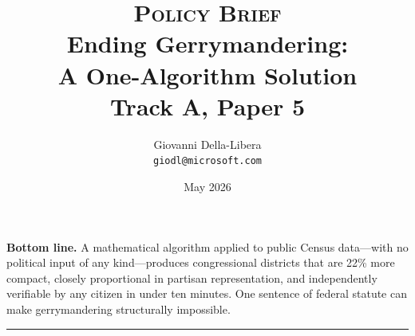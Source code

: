 \documentclass[12pt]{article}
\title{%
  {\Large\textsc{Policy Brief}}\\[8pt]
  \textbf{Ending Gerrymandering:\\A One-Algorithm Solution}\\[6pt]
  \large Track A, Paper 5
}
\author{Giovanni Della-Libera\\
\small\texttt{giodl@microsoft.com}}
\date{May 2026}
\begin{document}
\maketitle
\thispagestyle{empty}

\begin{pullquote}
\textbf{Bottom line.}
A mathematical algorithm applied to public Census data---with no
political input of any kind---produces congressional districts that are
22\% more compact, closely proportional in partisan representation,
and independently verifiable by any citizen in under ten minutes.
One sentence of federal statute can make gerrymandering structurally
impossible.
\end{pullquote}

\vspace{4pt}











\vspace{16pt}
\hrule
\vspace{8pt}
{\small


}
\end{document}
